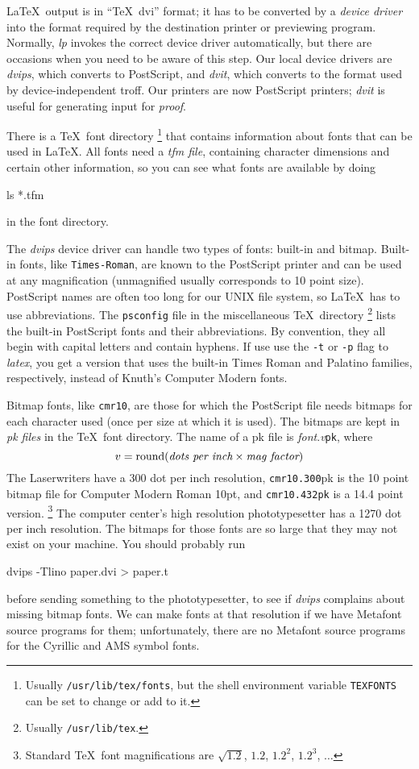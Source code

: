 \LaTeX\ output is in ``\TeX\ dvi'' format;
it has to be converted by a {\em device driver\/} into the
format required by the destination printer or previewing program.
Normally, {\em lp\/} invokes the correct device driver automatically,
but there are occasions when you need to be aware of this step.
Our local device drivers are {\em dvips}, which converts to PostScript,
and {\em dvit}, which converts to the format used by device-independent
troff.
Our printers are now PostScript printers;
{\em dvit\/} is useful for generating input for {\em proof}.

There is a \TeX\ font directory%
\footnote{Usually \verb|/usr/lib/tex/fonts|, but the
shell environment variable \verb|TEXFONTS| can be set to change or add to it.}
that contains information about fonts that can be used in \LaTeX.
All fonts need a {\em tfm file}, containing character dimensions and
certain other information, so you can see what fonts are available
by doing
\begin{eg}
ls *.tfm
\end{eg}
in the font directory.

The {\em dvips\/} device driver can handle two types of fonts:
built-in and bitmap.
Built-in fonts, like {\tt Times-Roman}, are known to the PostScript printer
and can be used at any magnification (unmagnified usually corresponds
to 10 point size).
PostScript names are often too long for our UNIX
file system, so \LaTeX\ has to use abbreviations.
The \verb|psconfig| file in the miscellaneous \TeX\ directory%
\footnote{Usually \verb|/usr/lib/tex|.}
lists the built-in PostScript fonts and their abbreviations.
By convention, they all begin with capital letters and contain hyphens.
If use use the \verb|-t| or \verb|-p| flag to {\em latex},
you get a version that uses the built-in Times Roman and Palatino families,
respectively, instead of Knuth's Computer Modern fonts.

Bitmap fonts, like {\tt cmr10}, are those for which the PostScript file
needs bitmaps for each character used (once per size at which it is used).
The bitmaps are kept in {\em pk files\/} in the \TeX\ font directory.
The name of a pk file is \mbox{{\em font}.{\em v\/}{\tt pk}}, where
\[
v={\rm round}(\hbox{\it dots per inch}\times\hbox{\it mag factor})
\]
The Laserwriters have a 300 dot per inch resolution, \verb|cmr10.300|pk
is the 10 point bitmap file for Computer Modern Roman 10pt,
and \verb|cmr10.432pk| is a 14.4 point version.%
\footnote{Standard \TeX\ font magnifications are $\sqrt{1.2}$, $1.2$, $1.2^2$,
$1.2^3$, $\ldots$}
The computer center's high resolution phototypesetter has a 1270 dot per
inch resolution.
The bitmaps for those fonts are so large that they may not exist on
your machine.
You should probably run
\begin{eg}
dvips -Tlino paper.dvi > paper.t
\end{eg}
before sending something to the phototypesetter, to see if {\em dvips\/}
complains about missing bitmap fonts.
We can make fonts at that resolution if we have Metafont source
programs for them;  unfortunately, there are no Metafont
source programs for the Cyrillic and AMS symbol fonts.

